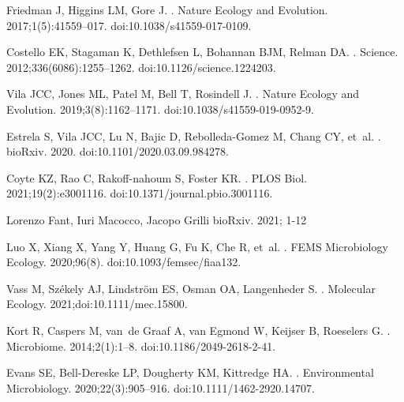 \documentclass[10pt,letterpaper]{article}
\begin{document}
\begin{thebibliography}{10}
Friedman J, Higgins LM, Gore J.
.
\newblock Nature Ecology and Evolution. 2017;1(5):41559--017.
\newblock doi:{10.1038/s41559-017-0109}.

Costello EK, Stagaman K, Dethlefsen L, Bohannan BJM, Relman DA.
.
\newblock Science. 2012;336(6086):1255--1262.
\newblock doi:{10.1126/science.1224203}.

Vila JCC, Jones ML, Patel M, Bell T, Rosindell J.
.
\newblock Nature Ecology and Evolution. 2019;3(8):1162--1171.
\newblock doi:{10.1038/s41559-019-0952-9}.

Estrela S, Vila JCC, Lu N, Bajic D, Rebolleda-Gomez M, Chang CY, et~al.
.
\newblock bioRxiv. 2020.
\newblock doi:{10.1101/2020.03.09.984278}.

Coyte KZ, Rao C, Rakoff-nahoum S, Foster KR.
.
\newblock PLOS Biol. 2021;19(2):e3001116.
\newblock doi:{10.1371/journal.pbio.3001116}.

\newblock Lorenzo Fant, Iuri Macocco, Jacopo Grilli
\newblock bioRxiv. 2021; 1-12

Luo X, Xiang X, Yang Y, Huang G, Fu K, Che R, et~al.
.
\newblock FEMS Microbiology Ecology. 2020;96(8).
\newblock doi:{10.1093/femsec/fiaa132}.

Vass M, Sz{\'{e}}kely AJ, Lindstr{\"{o}}m ES, Osman OA, Langenheder S.
.
\newblock Molecular Ecology. 2021;doi:{10.1111/mec.15800}.

Kort R, Caspers M, van~de Graaf A, van Egmond W, Keijser B, Roeselers G.
.
\newblock Microbiome. 2014;2(1):1--8.
\newblock doi:{10.1186/2049-2618-2-41}.

Evans SE, Bell-Dereske LP, Dougherty KM, Kittredge HA.
.
\newblock Environmental Microbiology. 2020;22(3):905--916.
\newblock doi:{10.1111/1462-2920.14707}.


\end{thebibliography}
\end{document}
